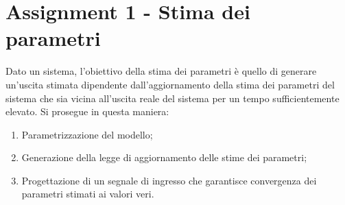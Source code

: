 \documentclass{article}
\begin{document}
\newtheorem{definizione}{Definizione}
\tableofcontents
\section{Assignment 1 - Stima dei parametri}%
Dato un sistema, l'obiettivo della stima dei parametri è quello di generare un'uscita stimata dipendente dall'aggiornamento della stima dei parametri del sistema che sia vicina all'uscita reale del sistema per un tempo sufficientemente elevato. Si prosegue in questa maniera:
\begin{enumerate}
    \item Parametrizzazione del modello;
    \item Generazione della legge di aggiornamento delle stime dei parametri;
    \item Progettazione di un segnale di ingresso che garantisce convergenza dei parametri stimati ai valori veri.
\end{enumerate}
\end{document}
